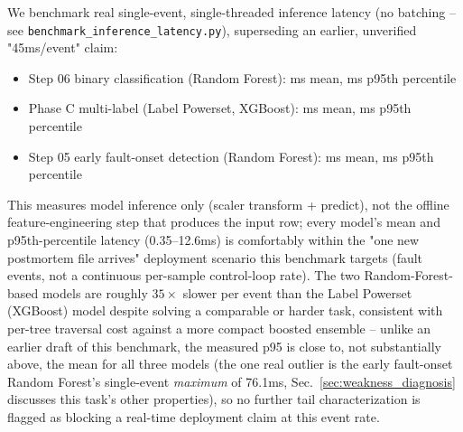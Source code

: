 We benchmark real single-event, single-threaded inference latency (no batching -- see \texttt{benchmark\_inference\_latency.py}), superseding an earlier, unverified "45ms/event" claim: %

\begin{itemize}
    \item Step 06 binary classification (Random Forest): \MetricInferenceLatencyBenchmarkStepZeroSixBinaryRfMeanMs{}ms mean, \MetricInferenceLatencyBenchmarkStepZeroSixBinaryRfPNineFiveMs{}ms p95th percentile %
    \item Phase C multi-label (Label Powerset, XGBoost): \MetricInferenceLatencyBenchmarkPhaseCLabelPowersetMeanMs{}ms mean, \MetricInferenceLatencyBenchmarkPhaseCLabelPowersetPNineFiveMs{}ms p95th percentile %
    \item Step 05 early fault-onset detection (Random Forest): \MetricInferenceLatencyBenchmarkStepZeroFivePrecursorRfMeanMs{}ms mean, \MetricInferenceLatencyBenchmarkStepZeroFivePrecursorRfPNineFiveMs{}ms p95th percentile %
\end{itemize}

This measures model inference only (scaler transform + predict), not the offline feature-engineering step that produces the input row; every model's mean and p95th-percentile latency (0.35--12.6ms) is comfortably within the "one new postmortem file arrives" deployment scenario this benchmark targets (fault events, not a continuous per-sample control-loop rate). The two Random-Forest-based models are roughly $35\times$ slower per event than the Label Powerset (XGBoost) model despite solving a comparable or harder task, consistent with per-tree traversal cost against a more compact boosted ensemble -- unlike an earlier draft of this benchmark, the measured p95 is close to, not substantially above, the mean for all three models (the one real outlier is the early fault-onset Random Forest's single-event \emph{maximum} of 76.1ms, Sec.~\ref{sec:weakness_diagnosis} discusses this task's other properties), so no further tail characterization is flagged as blocking a real-time deployment claim at this event rate. %

